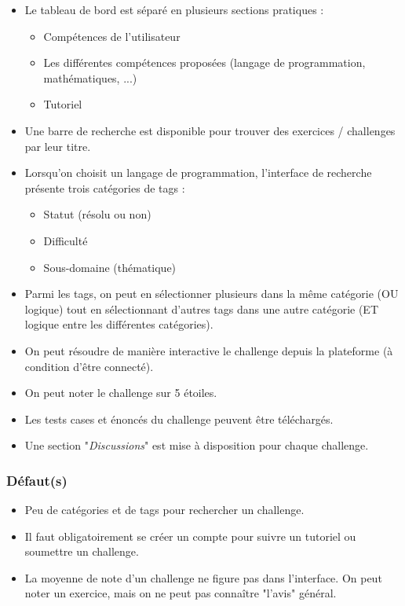 \begin{itemize}
    \item Le tableau de bord est séparé en plusieurs sections pratiques :
    \begin{itemize}
        \item Compétences de l'utilisateur
        \item Les différentes compétences proposées (langage de programmation, mathématiques, ...)
        \item Tutoriel
    \end{itemize}
    \item Une barre de recherche est disponible pour trouver des exercices / challenges par leur titre.
    \item Lorsqu'on choisit un langage de programmation, l'interface de recherche présente trois catégories de \glspl{tag} :
    \begin{itemize}
        \item Statut (résolu ou non)
        \item Difficulté
        \item Sous-domaine (thématique)
    \end{itemize}
    \item Parmi les \glspl{tag}, on peut en sélectionner plusieurs dans la même catégorie (OU logique) tout en sélectionnant d'autres \glspl{tag} dans une autre catégorie (ET logique entre les différentes catégories).
    \item On peut résoudre de manière interactive le challenge depuis la plateforme (à condition d'être connecté).
    \item On peut noter le challenge sur 5 étoiles.
    \item Les tests cases et énoncés du challenge peuvent être téléchargés.
    \item Une section "\textit{Discussions}" est mise à disposition pour chaque challenge.
\end{itemize}

\subsubsection*{Défaut(s)}

\begin{itemize}
    \item Peu de catégories et de \glspl{tag} pour rechercher un challenge.
    \item Il faut obligatoirement se créer un compte pour suivre un tutoriel ou soumettre un challenge.
    \item La moyenne de note d'un challenge ne figure pas dans l'interface. On peut noter un exercice, mais on ne peut pas connaître "l'avis" général.
\end{itemize}

